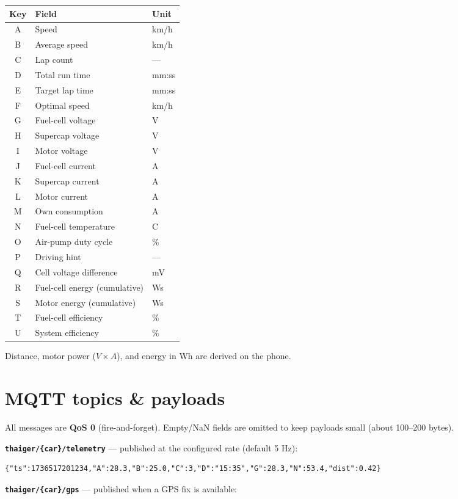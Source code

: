 \documentclass[11pt,a4paper,oneside]{report}
\newcommand{\degC}{\textdegree C}
\newcommand{\code}[1]{\texttt{#1}}
\begin{document}
\begin{tabularx}{\linewidth}{@{}clL@{}}
\toprule
\textbf{Key} & \textbf{Field} & \textbf{Unit}\\
\midrule
A & Speed & km/h\\
B & Average speed & km/h\\
C & Lap count & ---\\
D & Total run time & mm:ss\\
E & Target lap time & mm:ss\\
F & Optimal speed & km/h\\
G & Fuel-cell voltage & V\\
H & Supercap voltage & V\\
I & Motor voltage & V\\
J & Fuel-cell current & A\\
K & Supercap current & A\\
L & Motor current & A\\
M & Own consumption & A\\
N & Fuel-cell temperature & \degC{}\\
O & Air-pump duty cycle & \%\\
P & Driving hint & ---\\
Q & Cell voltage difference & mV\\
R & Fuel-cell energy (cumulative) & Ws\\
S & Motor energy (cumulative) & Ws\\
T & Fuel-cell efficiency & \%\\
U & System efficiency & \%\\
\bottomrule
\end{tabularx}

\medskip
Distance, motor power ($V \times A$), and energy in Wh are derived on the phone.

\section{MQTT topics \& payloads}
All messages are \textbf{QoS 0} (fire-and-forget). Empty/NaN fields are omitted to
keep payloads small (about 100--200 bytes).

\noindent\textbf{\code{thaiger/\{car\}/telemetry}} --- published at the configured
rate (default 5 Hz):

\begin{lstlisting}
{"ts":1736517201234,"A":28.3,"B":25.0,"C":3,"D":"15:35","G":28.3,"N":53.4,"dist":0.42}
\end{lstlisting}
\noindent\textbf{\code{thaiger/\{car\}/gps}} --- published when a GPS fix is
available:
\end{document}
